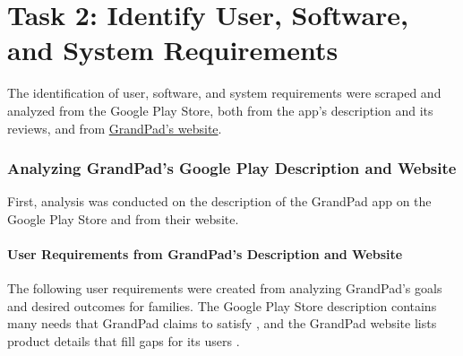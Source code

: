 \part*{Task 2: Identify User, Software, and System Requirements}

The identification of user, software, and system requirements were scraped and
    analyzed from the Google Play Store, both from the app's description and its
    reviews, and from \href{https://www.grandpad.net/}{GrandPad's website}.

\section*{Analyzing GrandPad's Google Play Description and Website}

First, analysis was conducted on the description of the GrandPad app on the
    Google Play Store and from their website.

\subsection*{User Requirements from GrandPad's Description and Website}

The following user requirements were created from analyzing GrandPad's goals and
    desired outcomes for families.
The Google Play Store description contains many needs that GrandPad claims to
    satisfy \cite{grandpad_google_play}, and the GrandPad website lists
    product details that fill gaps for its users \cite{grandpad_product_details}.

